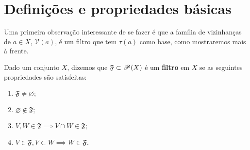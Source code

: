 \section{Definições e propriedades básicas}
\label{sec:propriedades}



 
 

 Uma primeira observação interessante de se fazer
 é que a família de vizinhanças de 
 $a \in X$,
 $\mathcal{V}(a)$,
 é um filtro que tem
 $\tau (a)$
 como base, como mostraremos mais à frente.

 \begin{definition}[Filtro]
 Dado um conjunto $X$, dizemos que 
 $\mathfrak{F} \subset {\mathscr{P}({X})}$ 
 é um \textbf{filtro} em $X$ 
 se as seguintes propriedades são satisfeitas:

 \begin{enumerate}
    \item $\mathfrak{F} \neq \varnothing$;
    \item $\varnothing \notin \mathfrak{F}$;
    \item $V, W \in \mathfrak{F} 
    \implies V\cap W \in \mathfrak{F}$;
    \item $V \in \mathfrak{F}, V \subset W
    \implies W \in \mathfrak{F}$.
 \end{enumerate}

 \end{definition}
 
